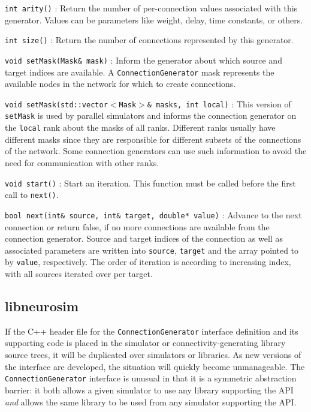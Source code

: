 \documentclass{frontiersSCNS} %
\begin{document}
\begin{unlist}
\item[\tt int arity()]: Return the number of per-connection values
  associated with this generator. Values can be parameters like
  weight, delay, time constants, or others.
\item[\tt int size()]: Return the number of connections represented by
  this generator.
\item[\tt void setMask(Mask\& mask)]: Inform the generator about which
  source and target indices are available. A
  \verb|ConnectionGenerator| mask represents the available nodes in
  the network for which to create connections.
\item[\tt void setMask(std::vector$<$Mask$>$\& masks, int local)]:
  This version of \texttt{setMask} is used by parallel simulators and
  informs the connection generator on the \verb|local| rank about the
  masks of all ranks. Different ranks usually have different masks
  since they are responsible for different subsets of the connections
  of the network. Some connection generators can use such information
  to avoid the need for communication with other ranks.
\item[\tt void start()]: Start an iteration. This function must be called
  before the first call to \verb|next()|.
\item[\tt bool next(int\& source, int\& target, double* value)]:
  Advance to the next connection or return false, if no more
  connections are available from the connection generator. Source and
  target indices of the connection as well as associated parameters
  are written into \verb|source|, \verb|target| and the array pointed
  to by \verb|value|, respectively. The order of iteration is
  according to increasing index, with all sources iterated over per
  target.
\end{unlist}

\subsection{libneurosim}\label{sec:libneurosim}
If the C++ header file for the \verb|ConnectionGenerator| interface
definition and its supporting code is placed
in the simulator or connectivity-generating library source trees, it
will be duplicated over simulators or libraries.  As new versions of
the interface are developed, the situation will quickly become
unmanageable.  The \verb|ConnectionGenerator| interface is
unusual in that it is a symmetric abstraction barrier: it both allows
a given simulator to use any library supporting the API \emph{and}
allows the same library to be used from any simulator supporting the
API.
\end{document}
